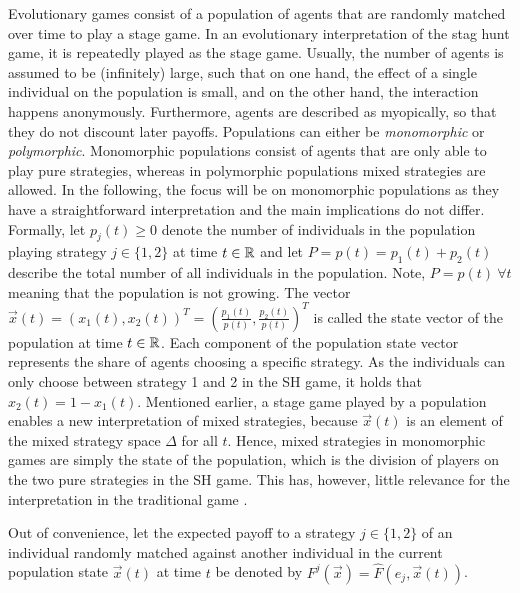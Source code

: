\label{sec:evolutionarystaghunt}
Evolutionary games consist of a population of agents that are randomly matched 
over time to play a stage game. In an evolutionary interpretation of the
stag hunt game, it is repeatedly played as the stage game.
Usually, the number of agents is assumed to be (infinitely) large, 
such that on one hand, the effect of a single individual 
on the population is small, and on the
other hand, the interaction happens anonymously.
Furthermore, agents are described as myopically, so that they do not 
discount later payoffs.
Populations can either be \textit{monomorphic} or \textit{polymorphic}.
Monomorphic populations consist of agents that are only able to play pure
strategies, whereas in polymorphic populations mixed strategies are allowed.
In the following, the focus will be on monomorphic populations as they have
a straightforward interpretation and the main implications do not differ. 
Formally, let $p_j(t) \geq 0$ denote the number of individuals in 
the population playing strategy $j \in \{1,2\}$ at time $t \in \mathbb{R}$ and 
let $P = p(t) = p_1(t) + p_2(t)$ describe the total number of all individuals 
in the population. Note, $P =p(t)\ \forall t$ meaning that the population 
is not growing. The vector $\vec{x}(t) = \left(x_1(t),x_2(t)\right)^T
=\left(\frac{p_1(t)}{p(t)},\frac{p_2(t)}{p(t)}\right)^T$ is called the state 
vector of the population at time $t \in \mathbb{R}$. 
Each component of the population state vector represents the share of agents 
choosing a specific strategy. As the individuals can only choose between 
strategy 1 and 2 in the SH game, it holds that  $x_2(t) = 1-x_1(t)$. 
Mentioned earlier, a stage game played by a population enables a 
new interpretation of mixed strategies, because $\vec{x}(t)$ is an 
element of the mixed strategy space $\Delta$ for all $t$.
Hence, mixed strategies in monomorphic games are simply the state
of the population, which is the division of players on the two
pure strategies in the SH game. 
This has, however, little relevance for the interpretation
in the traditional game \parencite[914-915]{rubinstein_comments_1991}.

Out of convenience, let the expected payoff 
to a strategy $j \in \{1,2\}$ of an individual randomly matched
against another individual in the current population state $\vec{x}(t)$ 
at time $t$ be denoted by $F^j(\vec{x}) = \hat{F}(e_j,\vec{x}(t))$. 

